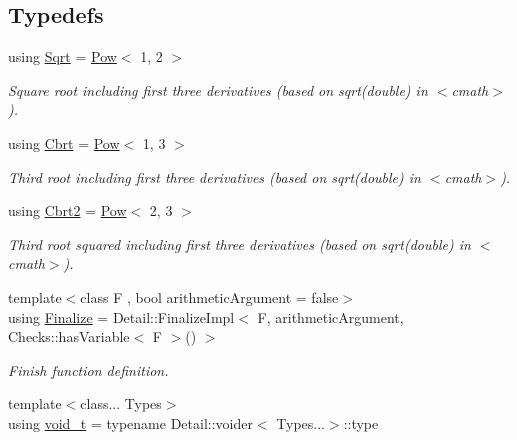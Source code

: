 \subsection*{Typedefs}
\begin{DoxyCompactItemize}
\item 
\hypertarget{group__CMathGroup_gaca80e773d5886f47cd49dc19b130263f}{using \hyperlink{group__CMathGroup_gaca80e773d5886f47cd49dc19b130263f}{Sqrt} = \hyperlink{structFunG_1_1Pow}{Pow}$<$ 1, 2 $>$}\label{group__CMathGroup_gaca80e773d5886f47cd49dc19b130263f}

\begin{DoxyCompactList}\small\item\em Square root including first three derivatives (based on sqrt(double) in $<$cmath$>$). \end{DoxyCompactList}\item 
\hypertarget{group__CMathGroup_ga2e4363ad8400e1c8431c10de2152ec2b}{using \hyperlink{group__CMathGroup_ga2e4363ad8400e1c8431c10de2152ec2b}{Cbrt} = \hyperlink{structFunG_1_1Pow}{Pow}$<$ 1, 3 $>$}\label{group__CMathGroup_ga2e4363ad8400e1c8431c10de2152ec2b}

\begin{DoxyCompactList}\small\item\em Third root including first three derivatives (based on sqrt(double) in $<$cmath$>$). \end{DoxyCompactList}\item 
\hypertarget{group__CMathGroup_ga9bcbef859d7ffd0d6570d69e1bd8503a}{using \hyperlink{group__CMathGroup_ga9bcbef859d7ffd0d6570d69e1bd8503a}{Cbrt2} = \hyperlink{structFunG_1_1Pow}{Pow}$<$ 2, 3 $>$}\label{group__CMathGroup_ga9bcbef859d7ffd0d6570d69e1bd8503a}

\begin{DoxyCompactList}\small\item\em Third root squared including first three derivatives (based on sqrt(double) in $<$cmath$>$). \end{DoxyCompactList}\item 
{\footnotesize template$<$class F , bool arithmetic\-Argument = false$>$ }\\using \hyperlink{namespaceFunG_ab2a52dfbc62e262c67f293fda5f81ef7}{Finalize} = Detail\-::\-Finalize\-Impl$<$ F, arithmetic\-Argument, Checks\-::has\-Variable$<$ F $>$() $>$
\begin{DoxyCompactList}\small\item\em Finish function definition. \end{DoxyCompactList}\item 
\hypertarget{namespaceFunG_a0cde667596590eb8d32e4a5ee76ddbb9}{{\footnotesize template$<$class... Types$>$ }\\using \hyperlink{namespaceFunG_a0cde667596590eb8d32e4a5ee76ddbb9}{void\-\_\-t} = typename Detail\-::voider$<$ Types...$>$\-::type}\label{namespaceFunG_a0cde667596590eb8d32e4a5ee76ddbb9}


\end{DoxyCompactItemize}
